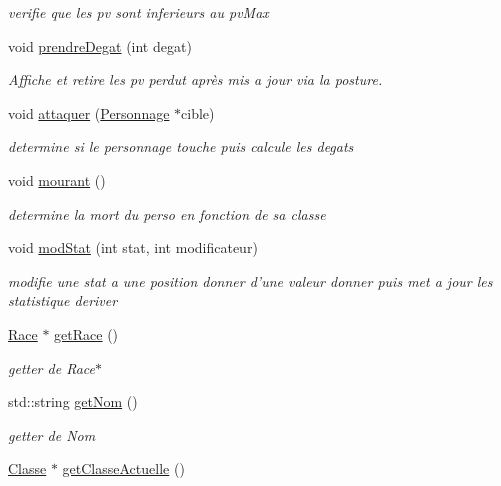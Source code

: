 \begin{DoxyCompactItemize}
\begin{DoxyCompactList}\small\item\em verifie que les pv sont inferieurs au pv\-Max \end{DoxyCompactList}\item 
void \hyperlink{classPersonnage_ac0c4df6c3f5858a254ffe2687447e9da}{prendre\-Degat} (int degat)
\begin{DoxyCompactList}\small\item\em Affiche et retire les pv perdut après mis a jour via la posture. \end{DoxyCompactList}\item 
void \hyperlink{classPersonnage_a1d43355b9b9aade85f3bb5ffec06b840}{attaquer} (\hyperlink{classPersonnage}{Personnage} $\ast$cible)
\begin{DoxyCompactList}\small\item\em determine si le personnage touche puis calcule les degats \end{DoxyCompactList}\item 
void \hyperlink{classPersonnage_a37a51c8be3bd343234f4ef009239f8ee}{mourant} ()
\begin{DoxyCompactList}\small\item\em determine la mort du perso en fonction de sa classe \end{DoxyCompactList}\item 
void \hyperlink{classPersonnage_a8944e1085ad9872619b66d484dd1b1f9}{mod\-Stat} (int stat, int modificateur)
\begin{DoxyCompactList}\small\item\em modifie une stat a une position donner d'une valeur donner puis met a jour les statistique deriver \end{DoxyCompactList}\item 
\hyperlink{classRace}{Race} $\ast$ \hyperlink{classPersonnage_afbe2ae0138f81a92e24db419bcbea9d5}{get\-Race} ()
\begin{DoxyCompactList}\small\item\em getter de Race$\ast$ \end{DoxyCompactList}\item 
std\-::string \hyperlink{classPersonnage_ac0fbc92a7e930ae26148e5e5247e1494}{get\-Nom} ()
\begin{DoxyCompactList}\small\item\em getter de Nom \end{DoxyCompactList}\item 
\hyperlink{classClasse}{Classe} $\ast$ \hyperlink{classPersonnage_aa306767186f6003aadf90a6e213334e7}{get\-Classe\-Actuelle} ()

\end{DoxyCompactItemize}
